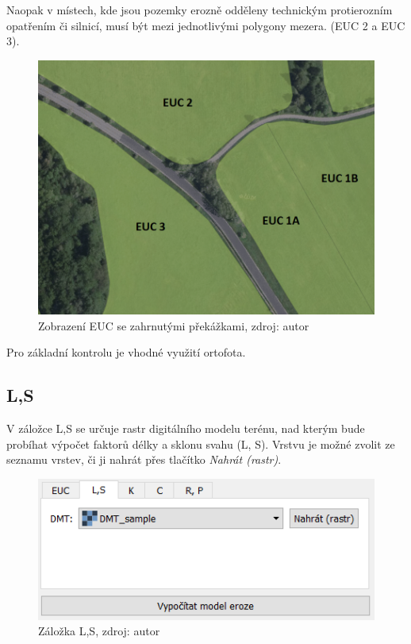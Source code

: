Naopak v místech, kde jsou pozemky erozně odděleny technickým
protierozním opatřením či silnicí, musí být mezi jednotlivými polygony
mezera. (EUC 2 a EUC 3).
\begin{figure}[H] \centering
		\includegraphics[width=.7\textwidth]{./pictures/rozdeleni_euc.png}
		\caption[Zobrazení EUC se zahrnutými
překážkami]{Zobrazení EUC se zahrnutými překážkami, zdroj: autor}
		\label{rozdeleni_euc}
\end{figure} Pro základní kontrolu je vhodné využití ortofota.
\subsection{L,S} V záložce L,S se určuje rastr digitálního modelu
terénu, nad kterým bude probíhat výpočet faktorů délky a sklonu svahu
(L, S). Vrstvu je možné zvolit ze seznamu vrstev, či ji nahrát přes
tlačítko \textit{Nahrát (rastr)}.
\begin{figure}[H] \centering
		\includegraphics[width=.6\textwidth]{./pictures/ls.png}
		\caption[Záložka L,S]{Záložka L,S, zdroj: autor}
		\label{zalozka_ls}
\end{figure}
